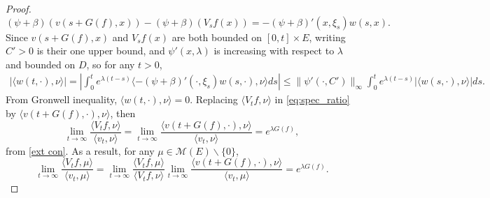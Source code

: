 \documentclass[12pt,a4paper]{amsart}
\numberwithin{equation}{section}
\theoremstyle{plain}
\theoremstyle{definition}
\begin{document}
\begin{proof}
  \[
    (\psi+\beta)(v(s+G(f),x))-(\psi+\beta)(V_sf(x))=-(\psi+\beta)'(x, \xi_s)w(s,x).
  \]
	Since $v(s+G(f),x)$ and $V_sf(x)$ are both bounded on $[0,t]\times E$, writing $C'>0$ is their one upper bound, and $\psi'(x, \lambda)$ is increasing with respect to $\lambda$ and bounded on $D$, so for any $t>0$,
  \begin{eqnarray*}
    |\langle w(t,\cdot),\nu\rangle |=|\int_0^te^{\lambda(t-s)}\langle -(\psi+\beta)'(\cdot, \xi_s)w(s,\cdot),\nu\rangle ds|\leq \|\psi'(\cdot,C')\|_\infty\int_0^te^{\lambda(t-s)}|\langle w(s,\cdot),\nu\rangle |ds.
  \end{eqnarray*}
	From Gronwell inequality, $\langle w(t,\cdot),\nu\rangle =0$.  Replacing $\langle V_tf,\nu\rangle $ in \eqref{eq:spec_ratio} by $\langle v(t+G(f),\cdot),\nu\rangle $, then
  \[
    \lim_{t\rightarrow\infty}\frac{\langle V_tf,\nu\rangle }{\langle v_t,\nu\rangle }=
    \lim_{t\rightarrow\infty}\frac{\langle v(t+G(f),\cdot),\nu\rangle }{\langle v_t,\nu\rangle }=e^{\lambda G(f)},
  \]
	from \eqref{ext con}.  As a result, for any $\mu\in\mathcal M(E)\backslash\{0\}$,
  \[
    \lim_{t\rightarrow\infty}\frac{\langle V_tf,\mu\rangle }{\langle v_t,\mu\rangle }
    =\lim_{t\rightarrow\infty}\frac{\langle V_tf,\mu\rangle }{\langle V_tf,\nu\rangle }
    \lim_{t\rightarrow\infty}\frac{\langle v(t+G(f),\cdot),\nu\rangle }{\langle v_t,\mu\rangle }=e^{\lambda G(f)}.
  \]
\end{proof}
\end{document}
